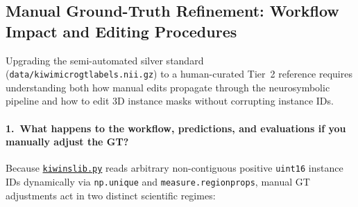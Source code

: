 \documentclass[10pt,a4paper]{article}
\renewcommand{\_}{\origunderscore\allowbreak}
\newcommand{\ghblob}{https://github.com/arvidl/BMED365-2027/blob/main}
\newcommand{\repodir}{Lab4-Comp-Imag/Kiwi-challenge/docs/neurosymbolic-report}
\newcommand{\nbref}[1]{\href{\ghblob/\repodir/notebooks/#1}{\texttt{#1}}}
\begin{document}
\subsection{Manual Ground-Truth Refinement: Workflow Impact and Editing Procedures}
\label{app:manual_gt}

Upgrading the semi-automated silver standard (\texttt{data/kiwi\_micro\_gt\_labels.nii.gz}) to a human-curated Tier~2 reference requires understanding both how manual edits propagate through the neurosymbolic pipeline and how to edit 3D instance masks without corrupting instance IDs.

\paragraph{1.\ What happens to the workflow, predictions, and evaluations if you manually adjust the GT?}
Because \nbref{kiwi\_ns\_lib.py} reads arbitrary non-contiguous positive \texttt{uint16} instance IDs dynamically via \texttt{np.unique} and \texttt{measure.regionprops}, manual GT adjustments act in two distinct scientific regimes:
\end{document}
